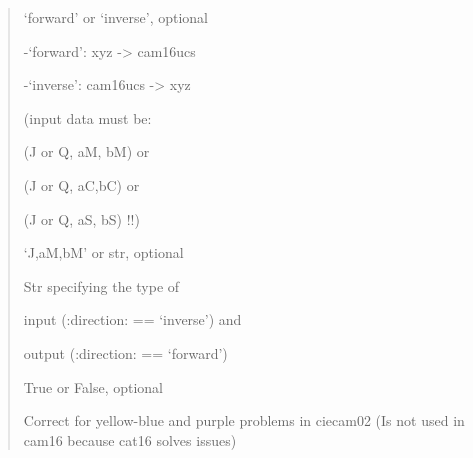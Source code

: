 \documentclass[letterpaper,10pt,english]{sphinxmanual}
\begin{document}
\begin{fulllineitems}
\begin{description}
\begin{quote}
\begin{description}
\item[{direction}] \leavevmode
\begin{DUlineblock}{0em}
\item[] ‘forward’ or ‘inverse’, optional
\item[]
\begin{DUlineblock}{\DUlineblockindent}
\item[] -‘forward’: xyz -\textgreater{} cam16ucs
\item[] -‘inverse’: cam16ucs -\textgreater{} xyz 
\item[]
\begin{DUlineblock}{\DUlineblockindent}
\item[] (input data must be:
\item[]
\begin{DUlineblock}{\DUlineblockindent}
\item[] (J or Q, aM, bM) or 
\item[] (J or Q, aC,bC) or 
\item[] (J or Q, aS, bS) !!)
\end{DUlineblock}
\end{DUlineblock}
\end{DUlineblock}
\end{DUlineblock}

\item[{outin}] \leavevmode
\begin{DUlineblock}{0em}
\item[] ‘J,aM,bM’ or str, optional
\item[] Str specifying the type of 
\item[]
\begin{DUlineblock}{\DUlineblockindent}
\item[] input (:direction: == ‘inverse’) and 
\item[] output (:direction: == ‘forward’)
\end{DUlineblock}
\end{DUlineblock}

\item[{yellowbluepurplecorrect}] \leavevmode
\begin{DUlineblock}{0em}
\item[] True or False, optional
\item[] Correct for yellow-blue and purple problems in ciecam02 
(Is not used in cam16 because cat16 solves issues)
\end{DUlineblock}


\end{description}
\end{quote}
\end{description}
\end{fulllineitems}
\end{document}
